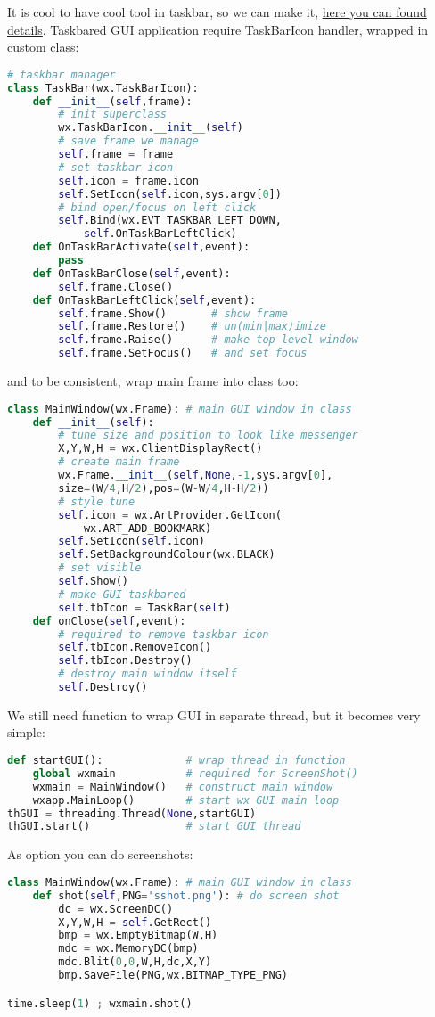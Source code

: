 It is cool to have cool tool in taskbar, so we can make it,
\href{http://www.blog.pythonlibrary.org/2013/07/12/wxpython-how-to-minimize-to-system-tray/}{here you can found details}.
Taskbared GUI application require TaskBarIcon handler, wrapped in custom class:
\begin{lstlisting}[language=python]
# taskbar manager
class TaskBar(wx.TaskBarIcon):	
	def __init__(self,frame):
		# init superclass
		wx.TaskBarIcon.__init__(self)
		# save frame we manage
		self.frame = frame
		# set taskbar icon
		self.icon = frame.icon
		self.SetIcon(self.icon,sys.argv[0])
		# bind open/focus on left click
		self.Bind(wx.EVT_TASKBAR_LEFT_DOWN,
			self.OnTaskBarLeftClick)
	def OnTaskBarActivate(self,event):
		pass
	def OnTaskBarClose(self,event):
		self.frame.Close()
	def OnTaskBarLeftClick(self,event):
		self.frame.Show()		# show frame
		self.frame.Restore()	# un(min|max)imize
		self.frame.Raise()		# make top level window
		self.frame.SetFocus()	# and set focus
\end{lstlisting}
and to be consistent, wrap main frame into class too:
\begin{lstlisting}[language=python]
class MainWindow(wx.Frame): # main GUI window in class
	def __init__(self):
		# tune size and position to look like messenger
		X,Y,W,H = wx.ClientDisplayRect()
		# create main frame
		wx.Frame.__init__(self,None,-1,sys.argv[0],
		size=(W/4,H/2),pos=(W-W/4,H-H/2))
		# style tune
		self.icon = wx.ArtProvider.GetIcon(
			wx.ART_ADD_BOOKMARK)
		self.SetIcon(self.icon)
		self.SetBackgroundColour(wx.BLACK)
		# set visible
		self.Show()
		# make GUI taskbared
		self.tbIcon = TaskBar(self)
	def onClose(self,event):
		# required to remove taskbar icon
		self.tbIcon.RemoveIcon()
		self.tbIcon.Destroy()
		# destroy main window itself
		self.Destroy()
\end{lstlisting}
We still need function to wrap GUI in separate thread, but it becomes
very simple:
\begin{lstlisting}[language=python]
def startGUI():				# wrap thread in function
	global wxmain			# required for ScreenShot()
	wxmain = MainWindow()	# construct main window
	wxapp.MainLoop()		# start wx GUI main loop
thGUI = threading.Thread(None,startGUI)
thGUI.start()				# start GUI thread
\end{lstlisting}
As option you can do screenshots:
\begin{lstlisting}[language=python]
class MainWindow(wx.Frame): # main GUI window in class
	def shot(self,PNG='sshot.png'):	# do screen shot
		dc = wx.ScreenDC()
		X,Y,W,H = self.GetRect()
		bmp = wx.EmptyBitmap(W,H)
		mdc = wx.MemoryDC(bmp)
		mdc.Blit(0,0,W,H,dc,X,Y)
		bmp.SaveFile(PNG,wx.BITMAP_TYPE_PNG)

time.sleep(1) ; wxmain.shot()
\end{lstlisting}

